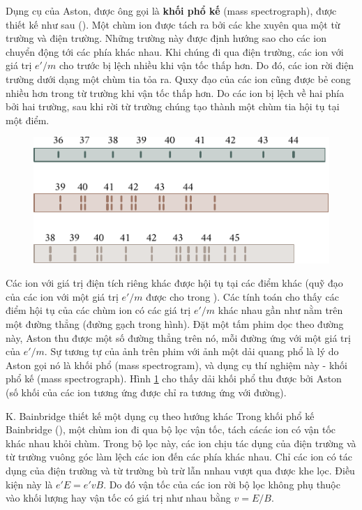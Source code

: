 Dụng cụ của Aston, được ông gọi là \textbf{khối phổ kế} (mass spectrograph), được thiết kế như sau ().
Một chùm ion được tách ra bởi các khe xuyên qua một từ trường và điện trường.
Những trường này được định hướng sao cho các ion chuyển động tới các phía khác nhau.
Khi chúng đi qua điện trường, các ion với giá trị $e'/m$ cho trước bị lệch nhiều khi vận tốc thấp hơn.
Do đó, các ion rời điện trường dưới dạng một chùm tia tỏa ra.
Quxy đạo của các ion cũng được bẻ cong nhiều hơn trong từ trường khi vận tốc thấp hơn.
Do các ion bị lệch về hai phía bởi hai trường, sau khi rời từ trường chúng tạo thành một chùm tia hội tụ tại một điểm.

\begin{figure}[t]
	\begin{center}
		\includegraphics[scale=0.93]{figures/ch_10/fig_10_12.pdf}
		\caption[]{}
		\label{fig:10_12}
	\end{center}
	\vspace{-0.9cm}
\end{figure}

Các ion với giá trị điện tích riêng khác được hội tụ tại các điểm khác (quỹ đạo của các ion với một giá trị $e'/m$ được cho trong ).
Các tính toán cho thấy các điểm hội tụ của các chùm ion có các giá trị $e'/m$ khác nhau gần như nằm trên một đường thẳng (đường gạch trong hình).
Đặt một tấm phim dọc theo đường này, Aston thu được một số đường thẳng trên nó, mỗi đường ứng với một giá trị của $e'/m$.
Sự tương tự của ảnh trên phim với ảnh một dải quang phổ là lý do Aston gọi nó là khối phổ (mass spectrogram), và dụng cụ thí nghiệm này - khối phổ kế (mass spectrograph).
Hình \ref{fig:10_12} cho thấy dải khối phổ thu được bởi Aston (số khối của các ion tương ứng được chỉ ra tương ứng với đường).

K. Bainbridge thiết kế một dụng cụ theo hướng khác
Trong khối phổ kế Bainbridge (), một chùm ion đi qua bộ lọc vận tốc, tách cácác ion có vận tốc khác nhau khỏi chùm.
Trong bộ lọc này, các ion chịu tác dụng của điện trường và từ trường vuông góc làm lệch các ion đến các phía khác nhau.
Chỉ các ion có tác dụng của điện trường và từ trường bù trừ lẫn nnhau vượt qua được khe lọc.
Điều kiện này là $e'E = e'vB$.
Do đó vận tốc của các ion rời bộ lọc không phụ thuộc vào khối lượng hay vận tốc có giá trị như nhau bằng $v = E/B$.

